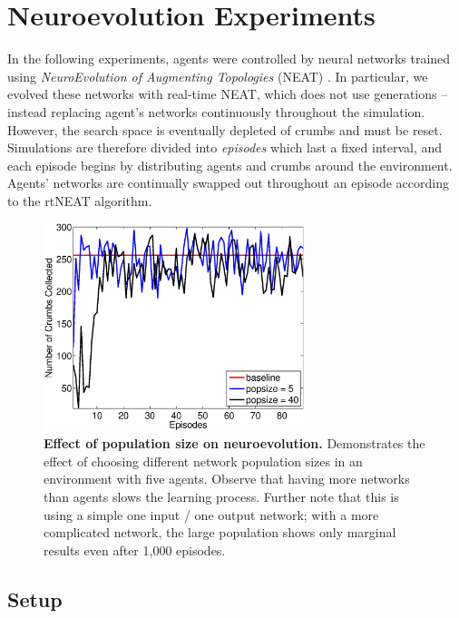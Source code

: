 \documentclass[conference]{IEEEtran}
\begin{document}

\section{Neuroevolution Experiments}
\label{section:neuro}

In the following experiments, agents were controlled by neural networks
trained using \textit{NeuroEvolution of Augmenting Topologies} (NEAT)
\cite{stanley2002evolving}.
In particular, we evolved these networks with real-time NEAT, which does not use generations -- instead replacing agent's networks continuously throughout the simulation. However, the search space is eventually depleted of crumbs and must be reset. Simulations are therefore divided into \textit{episodes} which last a fixed interval, and  each episode begins by distributing agents and crumbs around the environment. Agents' networks are continually swapped out throughout an episode according to the rtNEAT algorithm.

\begin{figure}[!t]
\centering
\includegraphics[width=3.0in]{./figures/neroevolution/pop_size.eps}
\caption{\textbf{Effect of population size on neuroevolution.} Demonstrates the effect of choosing different network population sizes in an environment with five agents. Observe that having more networks than agents slows the learning process. Further note that this is using a simple one input / one output network; with a more complicated network, the large population shows only marginal results even after 1,000 episodes.}
\label{neroevolution:pop_size}
\end{figure}

\subsection{Setup}
\end{document}
